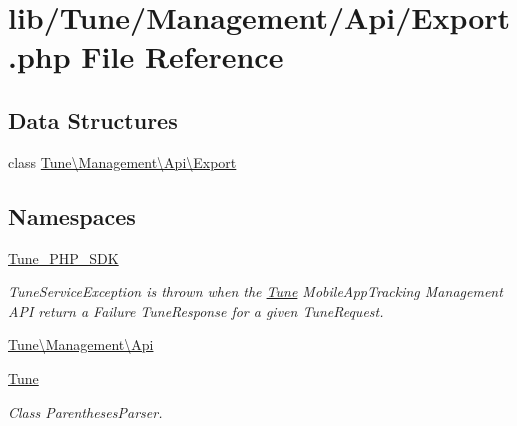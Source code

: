 \hypertarget{Export_8php}{\section{lib/\-Tune/\-Management/\-Api/\-Export.php File Reference}
\label{Export_8php}
}
\subsection*{Data Structures}
\begin{DoxyCompactItemize}
\item 
class \hyperlink{classTune_1_1Management_1_1Api_1_1Export}{Tune\textbackslash{}\-Management\textbackslash{}\-Api\textbackslash{}\-Export}
\end{DoxyCompactItemize}
\subsection*{Namespaces}
\begin{DoxyCompactItemize}
\item 
\hyperlink{namespaceTune__PHP__SDK}{Tune\-\_\-\-P\-H\-P\-\_\-\-S\-D\-K}
\begin{DoxyCompactList}\small\item\em Tune\-Service\-Exception is thrown when the \hyperlink{namespaceTune}{Tune} Mobile\-App\-Tracking Management A\-P\-I return a Failure Tune\-Response for a given Tune\-Request. \end{DoxyCompactList}\item 
\hyperlink{namespaceTune_1_1Management_1_1Api}{Tune\textbackslash{}\-Management\textbackslash{}\-Api}
\item 
\hyperlink{namespaceTune}{Tune}
\begin{DoxyCompactList}\small\item\em Class Parentheses\-Parser. \end{DoxyCompactList}\end{DoxyCompactItemize}
